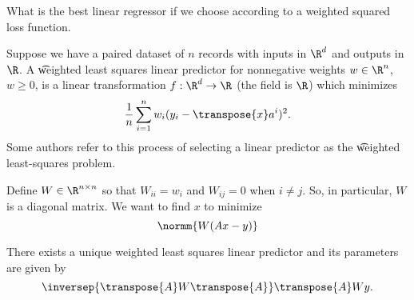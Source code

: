 

What is the best linear regressor if we choose according to a weighted squared loss function.


Suppose we have a paired dataset of $n$ records with inputs in $\R^d$ and outputs in $\R$.
A \t{weighted least squares linear predictor} for nonnegative weights $w \in \R^n$, $w \geq 0$, is a linear transformation $f: \R^d \to \R$ (the field is $\R$) which minimizes
\[
  \frac{1}{n} \sum_{i = 1}^{n} w_i(y_i - \transpose{x}a^i)^2.
\]
Some authors refer to this process of selecting a linear predictor as the \t{weighted least-squares problem}.

Define $W \in \R^{n \times n}$ so that $W_{ii} = w_i$ and $W_{ij} = 0$ when $i \neq j$.
So, in particular, $W$ is a diagonal matrix.
We want to find $x$ to minimize
\[
  \normm{W(Ax - y)}
\]


\begin{proposition}
There exists a unique weighted least squares linear predictor and its parameters are given by
\[
  \inversep{\transpose{A}W\transpose{A}}\transpose{A}Wy.
\]
\end{proposition}



\blankpage
